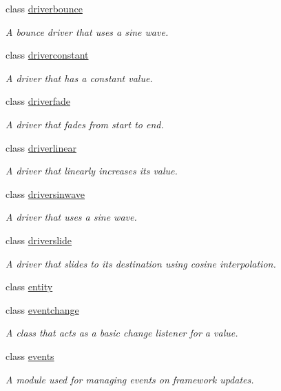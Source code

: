 \begin{DoxyCompactItemize}
class \hyperlink{classflounder_1_1driverbounce}{driverbounce}
\begin{DoxyCompactList}\small\item\em A bounce driver that uses a sine wave. \end{DoxyCompactList}\item 
class \hyperlink{classflounder_1_1driverconstant}{driverconstant}
\begin{DoxyCompactList}\small\item\em A driver that has a constant value. \end{DoxyCompactList}\item 
class \hyperlink{classflounder_1_1driverfade}{driverfade}
\begin{DoxyCompactList}\small\item\em A driver that fades from start to end. \end{DoxyCompactList}\item 
class \hyperlink{classflounder_1_1driverlinear}{driverlinear}
\begin{DoxyCompactList}\small\item\em A driver that linearly increases its value. \end{DoxyCompactList}\item 
class \hyperlink{classflounder_1_1driversinwave}{driversinwave}
\begin{DoxyCompactList}\small\item\em A driver that uses a sine wave. \end{DoxyCompactList}\item 
class \hyperlink{classflounder_1_1driverslide}{driverslide}
\begin{DoxyCompactList}\small\item\em A driver that slides to its destination using cosine interpolation. \end{DoxyCompactList}\item 
class \hyperlink{classflounder_1_1entity}{entity}
\item 
class \hyperlink{classflounder_1_1eventchange}{eventchange}
\begin{DoxyCompactList}\small\item\em A class that acts as a basic change listener for a value. \end{DoxyCompactList}\item 
class \hyperlink{classflounder_1_1events}{events}
\begin{DoxyCompactList}\small\item\em A module used for managing events on framework updates. \end{DoxyCompactList}\item 

\end{DoxyCompactItemize}
